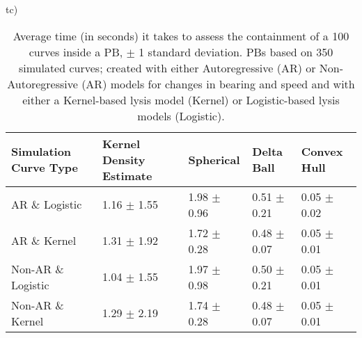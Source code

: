  tc)%
\begin{table}[ht!]
\centering
\begin{tabular}{|R{1.2in}||L{.95in}L{.9in}|L{.8in}L{.8in}|}
  \hline
Simulation Curve Type & Kernel Density Estimate & Spherical & Delta Ball & Convex Hull \\ 
  \hline
AR \& Logistic & 1.16 \(\pm\) 1.55 & 1.98 \(\pm\) 0.96 & 0.51 \(\pm\) 0.21 & 0.05 \(\pm\) 0.02 \\ 
  AR \& Kernel & 1.31 \(\pm\) 1.92 & 1.72 \(\pm\) 0.28 & 0.48 \(\pm\) 0.07 & 0.05 \(\pm\) 0.01 \\ 
  Non-AR \& Logistic & 1.04 \(\pm\) 1.55 & 1.97 \(\pm\) 0.98 & 0.50 \(\pm\) 0.21 & 0.05 \(\pm\) 0.01 \\ 
  Non-AR \& Kernel & 1.29 \(\pm\) 2.19 & 1.74 \(\pm\) 0.28 & 0.48 \(\pm\) 0.07 & 0.05 \(\pm\) 0.01 \\ 
   \hline
\end{tabular}
\caption{Average time (in seconds) it takes to  assess the containment of a 100 curves inside a PB, \(\pm\) 1 standard deviation. PBs based on 350 simulated curves; created with either Autoregressive (AR) or Non-Autoregressive (AR) models for changes in bearing and speed and with either a Kernel-based lysis model (Kernel) or Logistic-based lysis models (Logistic).} 
\label{tab:time_prediction100}
\end{table}
